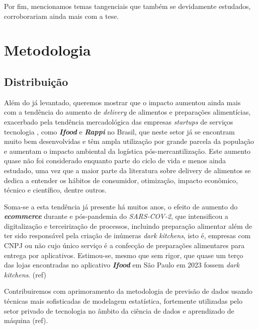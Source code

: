 \documentclass[14pt,a4paper]{article}
\begin{document}
	Por fim, mencionamos temas tangenciais que também se devidamente estudados, corroborariam ainda mais com a tese.


	\section{Metodologia}

	
	\subsection{Distribuição}
	
	Além do já levantado, queremos mostrar que o impacto aumentou ainda mais com a tendência do aumento de \textit{delivery} de alimentos e preparações alimentícias, exacerbado pela tendência mercadológica das empresas \textit{startups} de serviços tecnologia , como \textbf{\textit{Ifood}} e \textbf{\textit{Rappi}} no Brasil, que neste setor já se encontram muito bem desenvolvidas e têm ampla utilização por grande parcela da população e aumentam o impacto ambiental da logística pós-mercantilização. Este aumento quase não foi considerado enquanto parte do ciclo de vida e menos ainda estudado, uma vez que a maior parte da literatura sobre delivery de alimentos se dedica a entender os hábitos de consumidor, otimização, impacto econômico, técnico e científico, dentre outros.
	
	Soma-se a esta tendência já presente há muitos anos, o efeito de aumento do \textit{\textbf{ecommerce}} durante e pós-pandemia do \textit{SARS-COV-2}, que intensificou a digitalização e terceirização de processos, incluindo preparação alimentar além de ter sido responsável pela criação de inúmeras \textit{dark kitchens}, isto é, empresas com CNPJ ou não cujo único serviço é a confecção de preparações alimentares para entrega por aplicativos. Estimou-se, mesmo que sem rigor, que quase um terço das lojas encontradas no aplicativo \textit{\textbf{Ifood}} em São Paulo em 2023 fossem \textit{dark kitchens}. (ref)
	
	Contribuiremos com aprimoramento da metodologia de previsão de dados usando técnicas mais sofisticadas de modelagem estatística, fortemente utilizadas pelo setor privado de tecnologia no âmbito da ciência de dados e aprendizado de máquina (ref).  
	
\end{document}
